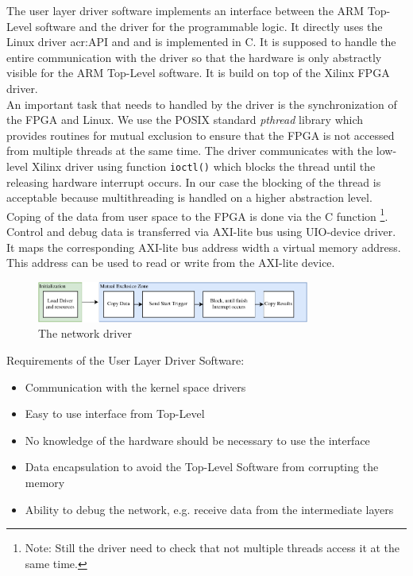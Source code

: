 The user layer driver software implements an interface between the ARM Top-Level software and the driver for the programmable logic. It directly uses the Linux driver \gls{acr:API} and and is implemented in C. It is supposed to handle the entire communication with the driver so that the hardware is only abstractly visible for the ARM Top-Level software. It is build on top of the Xilinx FPGA driver. \\
\noindent
An important task that needs to handled by the driver is the synchronization of the FPGA and Linux. We use the POSIX standard \emph{pthread} library which provides routines for mutual exclusion to ensure that the FPGA is not accessed from multiple threads at the same time. The driver communicates with the low-level Xilinx driver using function \texttt{ioctl()} which blocks the thread until the releasing hardware interrupt occurs. In our case the blocking of the thread is acceptable because multithreading is handled on a higher abstraction level. Coping of the data from user space to the FPGA is done via the C function \footnote{Note: Still the driver need to check that not multiple threads access it at the same time.}. \\
Control and debug data is transferred via AXI-lite bus using UIO-device driver. It maps the corresponding AXI-lite bus address width a virtual memory address. This address can be used to read or write from the AXI-lite device. 



\begin{figure}[hbt]
  \centering
  \includegraphics[width=0.8\textwidth]{img/eggdriver}
  \caption{The network driver}
  \label{fig:sw-python-eggdriver-build}
\end{figure}

Requirements of the User Layer Driver Software:
\begin{itemize} 
	\item Communication with the kernel space drivers 
	\item Easy to use interface from Top-Level 
	\item No knowledge of the hardware should be necessary to use the interface
	\item Data encapsulation to avoid the Top-Level Software from corrupting the memory 
	\item Ability to debug the network, e.g. receive data from the intermediate layers
\end{itemize}

